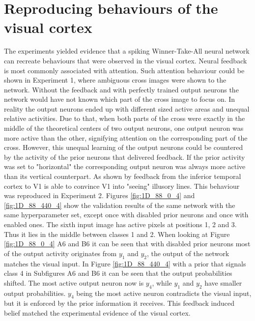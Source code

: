\section{Reproducing behaviours of the visual cortex}
The experiments yielded evidence that a spiking Winner-Take-All neural network can recreate behaviours that were observed in the visual cortex. Neural feedback is most commonly associated with attention. Such attention behaviour could be shown in Experiment 1, where ambiguous cross images were shown to the network. Without the feedback and with perfectly trained output neurons the network would have not known which part of the cross image to focus on. In reality the output neurons ended up with different sized active areas and unequal relative activities. Due to that, when both parts of the cross were exactly in the middle of the theoretical centers of two output neurons, one output neuron was more active than the other, signifying attention on the corresponding part of the cross. However, this unequal learning of the output neurons could be countered by the activity of the prior neurons that delivered feedback. If the prior activity was set to "horizontal" the corresponding output neuron was always more active than its vertical counterpart. 
As shown by \citet{HierachicalBayesVisualCortex} feedback from the inferior temporal cortex to V1 is able to convince V1 into "seeing" illusory lines. This behaviour was reproduced in Experiment 2. Figures \ref{fig:1D_88_0_4} and \ref{fig:1D_88_440_4} show the validation results of the same network with the same hyperparameter set, except once with disabled prior neurons and once with enabled ones. The sixth input image has active pixels at positions 1, 2 and 3. Thus it lies in the middle between classes 1 and 2. When looking at Figure \ref{fig:1D_88_0_4} A6 and B6 it can be seen that with disabled prior neurons most of the output activity originates from $y_1$ and $y_2$, the output of the network  matches the visual input. In Figure \ref{fig:1D_88_440_4} with a prior that signals class 4 in Subfigures A6 and B6 it can be seen that the output probabilities shifted. The most active output neuron now is $y_4$, while $y_1$ and $y_2$ have smaller output probabilities. $y_4$ being the most active neuron contradicts the visual input, but it is enforced by the prior information it receives. This feedback induced belief matched the experimental evidence of the visual cortex.

